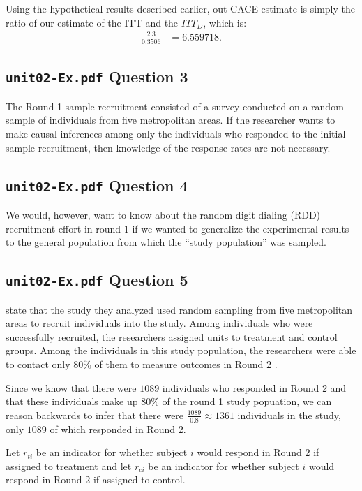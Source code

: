 \documentclass[11pt]{article}\usepackage[]{graphicx}\usepackage[]{color}
\theoremstyle{newstyle}
\begin{document}
Using the hypothetical results described earlier, out CACE estimate is simply the ratio of our estimate of the ITT and the $ITT_D$, which is:
\begin{align*}
\frac{2.3}{0.3506} & = 6.559718.
\end{align*}

\subsection{\texttt{unit02-Ex.pdf} Question 3}

The Round 1 sample recruitment consisted of a survey conducted on a random sample of individuals from five metropolitan areas. If the researcher wants to make causal inferences among only the individuals who responded to the initial sample recruitment, then knowledge of the response rates are not necessary.

\subsection{\texttt{unit02-Ex.pdf} Question 4}

We would, however, want to know about the random digit dialing (RDD) recruitment effort in round $1$ if we wanted to generalize the experimental results to the general population from which the ``study population'' was sampled.

\subsection{\texttt{unit02-Ex.pdf} Question 5}

\citet{albertsonlawrence2009} state that the study they analyzed used random sampling from five metropolitan areas to recruit individuals into the study. Among individuals who were successfully recruited, the researchers assigned units to treatment and control groups. Among the individuals in this study population, the researchers were able to contact only 80\% of them to measure outcomes in Round 2 \citep[284]{albertsonlawrence2009}.

Since we know that there were $1089$ individuals who responded in Round 2 and that these individuals make up 80\% of the round 1 study popuation, we can reason backwards to infer that there were $\frac{1089}{0.8} \approx 1361$ individuals in the study, only $1089$ of which responded in Round 2.

Let $r_{ti}$ be an indicator for whether subject $i$ would respond in Round 2 if assigned to treatment and let $r_{ci}$ be an indicator for whether subject $i$ would respond in Round 2 if assigned to control.
\end{document}
